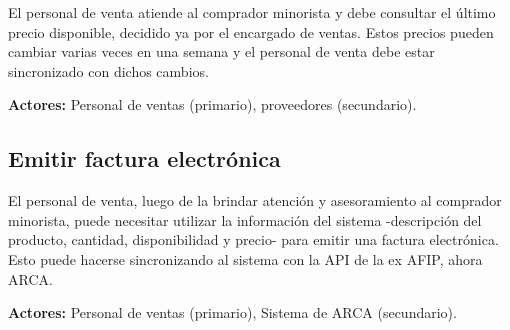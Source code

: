 El personal de venta atiende al comprador minorista y debe consultar el último precio disponible,
decidido ya por el encargado de ventas.
Estos precios pueden cambiar varias veces en una semana y el personal de venta debe estar sincronizado con dichos cambios.

\textbf{Actores:} Personal de ventas (primario), proveedores (secundario).

\subsection{Emitir factura electrónica}

El personal de venta, 
luego de la brindar atención y asesoramiento al comprador minorista,
puede necesitar utilizar la información del sistema
-descripción del producto, cantidad, disponibilidad y precio-
para emitir una factura electrónica.
Esto puede hacerse sincronizando al sistema con la API de la ex AFIP,
ahora ARCA.

\textbf{Actores:} Personal de ventas (primario), Sistema de ARCA (secundario).
